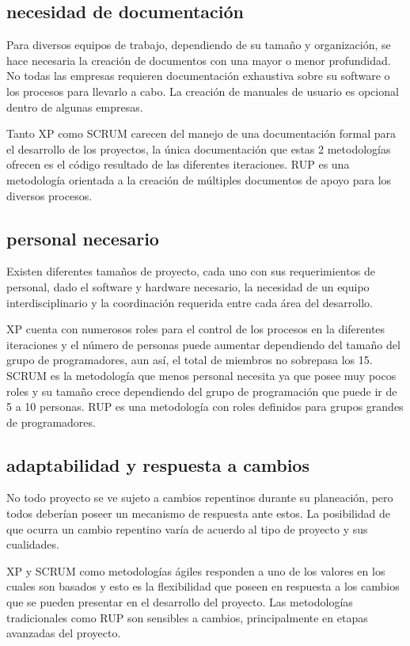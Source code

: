 \documentclass[12pt,a4paper]{article}
\newcommand{\espacio}{\par\vspace{3mm}}
\begin{document}
\subsection*{necesidad de documentación}
Para diversos equipos de trabajo, dependiendo de su tamaño y organización, se hace necesaria la creación de documentos con una mayor o menor profundidad. No todas las empresas requieren documentación exhaustiva sobre su software o los procesos para llevarlo a cabo. La creación de manuales de usuario es opcional dentro de algunas empresas.
\espacio Tanto XP como SCRUM carecen del manejo de una documentación formal para el desarrollo de los proyectos, la única documentación que estas 2 metodologías ofrecen es el código resultado de las diferentes iteraciones. RUP es una metodología orientada a la creación de múltiples documentos de apoyo para los diversos procesos.
\subsection*{personal necesario}
Existen diferentes tamaños de proyecto, cada uno con sus requerimientos de personal, dado el software y hardware necesario, la necesidad de un equipo interdisciplinario y la coordinación requerida entre cada área del desarrollo.
\espacio XP cuenta con numerosos roles para el control de los procesos en la diferentes iteraciones y el
número de personas puede aumentar dependiendo del tamaño del grupo de programadores, aun así, el total de miembros no sobrepasa los 15. SCRUM es la metodología que menos personal necesita ya que posee muy pocos roles y su tamaño crece dependiendo del grupo de programación que puede ir de 5 a 10 personas. RUP es una metodología con roles definidos para grupos grandes de programadores.
\subsection*{adaptabilidad y respuesta a cambios}
No todo proyecto se ve sujeto a cambios repentinos durante su planeación, pero todos deberían poseer un mecanismo de respuesta ante estos. La posibilidad de que ocurra un cambio repentino varía de acuerdo al tipo de proyecto y sus cualidades.
\espacio XP y SCRUM como metodologías ágiles responden a uno de los valores en los cuales son basados y esto es la flexibilidad que poseen en respuesta a los cambios que se pueden presentar en el desarrollo del proyecto. Las metodologías tradicionales como RUP son sensibles a cambios, principalmente en etapas avanzadas del proyecto.
\end{document}
